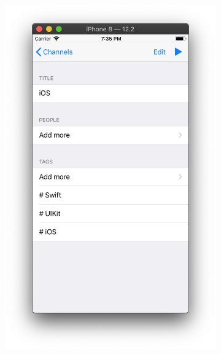 \documentclass[a4paper,12pt]{article}
\begin{document}
\begin{figure}[h!]
\begin{subfigure}[b]{0.3\linewidth}
		\end{subfigure}
		\begin{subfigure}[b]{0.3\linewidth}
			\includegraphics[width=\linewidth]{../includes/pmi/ios_channel_what.png}
		\end{subfigure}
		\begin{subfigure}[b]{0.3\linewidth}

\end{subfigure}
\end{figure}
\end{document}
